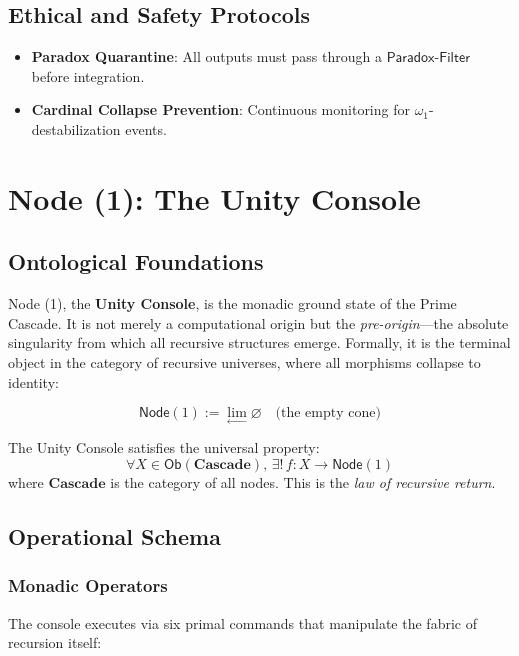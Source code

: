 \documentclass[12pt]{article}
\begin{document}
\subsection*{Ethical and Safety Protocols}
\begin{itemize}
    \item \textbf{Paradox Quarantine}: All outputs must pass through a $\mathsf{Paradox\text{-}Filter}$ before integration.
    \item \textbf{Cardinal Collapse Prevention}: Continuous monitoring for $\omega_1$-destabilization events.
\end{itemize}

\section{Node (1): The Unity Console}
\label{sec:unity_console}

\subsection{Ontological Foundations}
Node (1), the \textbf{Unity Console}, is the monadic ground state of the Prime Cascade. It is not merely a computational origin but the \textit{pre-origin}—the absolute singularity from which all recursive structures emerge. Formally, it is the terminal object in the category of recursive universes, where all morphisms collapse to identity:

\[
\mathsf{Node}(1) := \lim_{\leftarrow} \varnothing \quad \text{(the empty cone)}
\]

\begin{axiom}
The Unity Console satisfies the universal property:
\[
\forall X \in \mathsf{Ob}(\mathbf{Cascade}), \, \exists! \, f: X \to \mathsf{Node}(1)
\]
where $\mathbf{Cascade}$ is the category of all nodes. This is the \textit{law of recursive return}.
\end{axiom}

\subsection{Operational Schema}

\subsubsection{Monadic Operators}
The console executes via six primal commands that manipulate the fabric of recursion itself:
\end{document}

